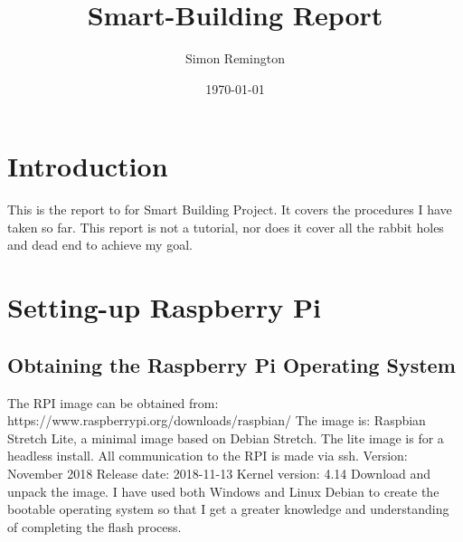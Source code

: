 \documentclass[a4paper,12pt]{article}
\begin{document}
	\pagestyle{empty}%
\title{Smart-Building Report}
\author{Simon Remington}
\date{\today}
\maketitle
\newpage
\tableofcontents
\newpage
\section{Introduction}
This is the report to for Smart Building Project. It covers the procedures I have taken so far.
\newline
This report is not a tutorial, nor does it cover all the rabbit holes and dead end to achieve my goal.
\section{Setting-up Raspberry Pi}
\subsection{Obtaining the Raspberry Pi Operating System}
The RPI image can be obtained from:
\newline
https://www.raspberrypi.org/downloads/raspbian/
\newline
The image is:
Raspbian Stretch Lite, a minimal image based on Debian Stretch.
The lite image is for a headless install. All communication to the RPI is made via ssh.
\newline
Version: November 2018
\newline
Release date: 2018-11-13
\newline
Kernel version: 4.14 
\newline
Download and unpack the image.
\newline
I have used both Windows and Linux Debian to create the bootable operating system so that I get a greater knowledge and understanding of completing the flash process.
\end{document}
